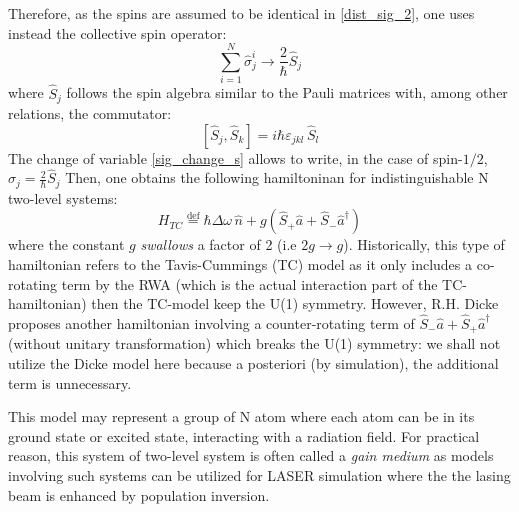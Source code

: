 \documentclass[10pt]{report}
\begin{document}
Therefore, as the spins are assumed to be identical in \eqref{dist_sig_2}, one uses instead the collective spin operator:
\begin{equation}
\label{sig_change_s}
\sum_{i=1}^{N} \hat{\sigma}_j^i \rightarrow \frac{2}{\hbar} \hat{S}_j
\end{equation}
where $\hat{S}_j$ follows the spin algebra similar to the Pauli matrices with, among other relations, the commutator:
\begin{equation}
{\displaystyle [\hat{S} _{j},\hat{S} _{k}]=i\hbar\varepsilon _{jkl}\,\hat{S} _{l}}
\end{equation}
The change of variable \eqref{sig_change_s} allows to write, in the case of spin-$1/2$, $\hat{\sigma}_j = \frac{2}{\hbar}\hat{S}_j$ Then, one obtains the following hamiltoninan for indistinguishable N two-level systems:
\begin{equation}
H_{TC} \stackrel{\text{def}}{=} \hbar\Delta\omega\,\hat{n} + g \left(\hat{S}_+ \hat{a} + \hat{S}_-\hat{a}^{\dag} \right)
\end{equation}
where the constant $g$ \textit{swallows} a factor of 2 (i.e $2g \rightarrow g$). Historically, this type of hamiltonian refers to the Tavis-Cummings (TC) model as it only includes a co-rotating term by the RWA (which is the actual interaction part of the TC-hamiltonian) then the TC-model keep the U(1) symmetry. However, R.H. Dicke proposes another hamiltonian involving a counter-rotating term of $\hat{S}_- \hat{a} + \hat{S}_+\hat{a}^{\dag}$ (without unitary transformation) which breaks the U(1) symmetry: we shall not utilize the Dicke model here because a posteriori (by simulation), the additional term is unnecessary.

This model may represent a group of N atom where each atom can be in its ground state or excited state, interacting with a radiation field. For practical reason, this system of two-level system is often called a \textit{gain medium} as models involving such systems can be utilized for LASER simulation where the the lasing beam is enhanced by population inversion.
\end{document}
